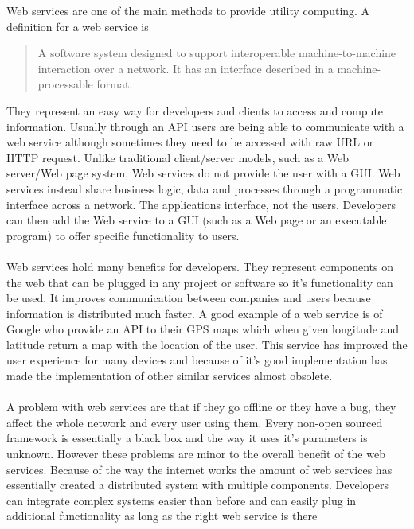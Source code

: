 Web services are one of the main methods to provide utility computing. A definition for a web service is  
\begin{quote}A software system designed to support interoperable machine-to-machine interaction over a network. It has an interface described in a machine-processable format.\end{quote}
They represent an easy way for developers and clients to access and compute information. Usually through an API users are
being able to communicate with a web service although sometimes they need to be accessed with raw URL or HTTP request.
Unlike traditional client/server models, such as a Web server/Web page system, Web services do not provide the user with a GUI.
Web services instead share business logic, data and processes through a programmatic interface across a network. The applications
interface, not the users. Developers can then add the Web service to a GUI (such as a Web page or an executable program) to offer
specific functionality to users.
\paragraph{}
Web services hold many benefits for developers. They represent components on the web that can be plugged in any project
or software so it's functionality can be used. It improves communication between companies and users because information
is distributed much faster. A good example of a web service is of Google who provide an API to their GPS maps which when 
given longitude and latitude return a map with the location of the user. This service has improved the user experience
for many devices and because of it's good implementation has made the implementation of other similar services almost
obsolete.
\paragraph{}
A problem with web services are that if they go offline or they have a bug, they affect the whole network and every
user using them. Every non-open sourced framework is essentially a black box and the way it uses it's parameters is unknown.
However these problems are minor to the overall benefit of the web services. Because of the way the internet works
the amount of web services has essentially created a distributed system with multiple components. Developers can integrate
complex systems easier than before and can easily plug in additional functionality as long as the right web service is there 

